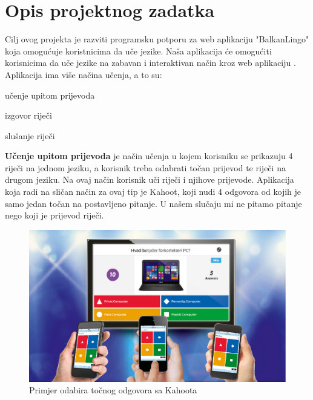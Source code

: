 \chapter{Opis projektnog zadatka}

		Cilj ovog projekta je razviti programsku potporu za web aplikaciju "BalkanLingo" koja omogućuje koristnicima da uče jezike.
		Naša aplikacija će omogućiti korisnicima da uče jezike na zabavan i interaktivan način kroz web aplikaciju .
		Aplikacija ima više načina učenja, a to su: 
		\begin{packed_item}
			\item učenje upitom prijevoda
			\item izgovor riječi
			\item slušanje riječi
		\end{packed_item}

		\textbf{Učenje upitom prijevoda} je način učenja u kojem korisniku se prikazuju 4 riječi na jednom jeziku, a korisnik treba odabrati točan prijevod te riječi na drugom jeziku.
		Na ovaj način korisnik uči riječi i njihove prijevode. Aplikacija koja radi na sličan način za ovaj tip je Kahoot, koji nudi 4 odgovora od kojih je samo jedan točan na postavljeno pitanje. U našem slučaju mi ne pitamo pitanje nego koji je prijevod riječi.
		\begin{figure}[H]
			\centering
			\includegraphics[width=0.8\linewidth]{slike/Kahoot.png}
			\caption{Primjer odabira točnog odgovora sa Kahoota}
			\label{fig:rijecnik}
		\end{figure}
		
